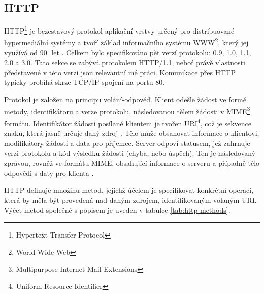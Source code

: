 \documentclass[czech,DP]{thesiskiv}
\begin{document}




\subsection{HTTP}

HTTP\footnote{Hypertext Transfer Protocol} je bezestavový protokol aplikační vrstvy určený pro distribuované hypermediální systémy a tvoří základ informačního systému WWW\footnote{World Wide Web}, který jej využívá od 90. let \cite{httpRfc}. Celkem bylo specifikováno pět verzí protokolu: 0.9, 1.0, 1.1, 2.0 a 3.0. Tato sekce se zabývá protokolem HTTP/1.1, neboť právě vlastnosti představené v této verzi jsou relevantní mé práci. Komunikace přes HTTP typicky probíhá skrze TCP/IP spojení na portu 80. 

Protokol je založen na principu volání-odpověď. Klient odešle žádost ve formě metody, identifikátoru a verze protokolu, následovanou tělem žádosti v MIME\footnote{Multipurpose Internet Mail Extensions} formátu. Identifikátor žádosti posílané klientem je tvořen URI\footnote{Uniform Resource Identifier}, což je sekvence znaků, která jasně určuje daný zdroj \cite{uriRfc}. Tělo může obsahovat informace o klientovi, modifikátory žádosti a data pro příjemce. Server odpoví statusem, jež zahrnuje verzi protokolu a kód výsledku žádosti (chyba, nebo úspěch). Ten je následovaný zprávou, rovněž ve formátu MIME, obsahující informace o serveru a případně tělo odpovědi s daty pro klienta \cite{httpRfc}.

HTTP definuje množinu metod, jejichž účelem je specifikovat konkrétní operaci, která by měla být provedená nad daným zdrojem, identifikovaným volaným URI. Výčet metod společně s popisem je uveden v tabulce \ref{tab:http-methods}.
\end{document}
